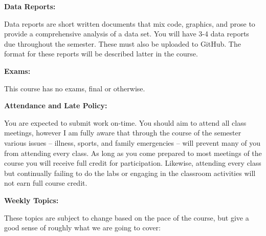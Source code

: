\documentclass[12pt]{article}
\begin{document}
\vspace{0.4cm}

\textbf{Data Reports:} \vspace{6pt}

Data reports are short written documents that mix code, graphics,
and prose to provide a comprehensive analysis of a data set.
You will have 3-4 data reports due throughout the semester.
These must also be uploaded to GitHub. The format for these
reports will be described latter in the course.

\vspace{0.4cm}

\textbf{Exams:} \vspace{6pt}

This course has no exams, final or otherwise.

\vspace{0.4cm}

\textbf{Attendance and Late Policy:} \vspace{6pt}

You are expected to submit work on-time.
You should aim to attend all class meetings, however I am fully aware that through
the course of the semester various issues -- illness, sports, and family emergencies --
will prevent many of you from attending every class. As long as you come
prepared to most meetings of the course you will receive full credit for participation.
Likewise, attending every class but continually failing to do the labs or engaging in
the classroom activities will not earn full course credit.

\vspace{0.5cm}

\textbf{Weekly Topics:} \vspace{6pt}

These topics are subject to change based on the pace of the course, but
give a good sense of roughly what we are going to cover:

\vspace{0.5cm}

\def\labelitemi{}
\def\labelitemii{}
\end{document}
